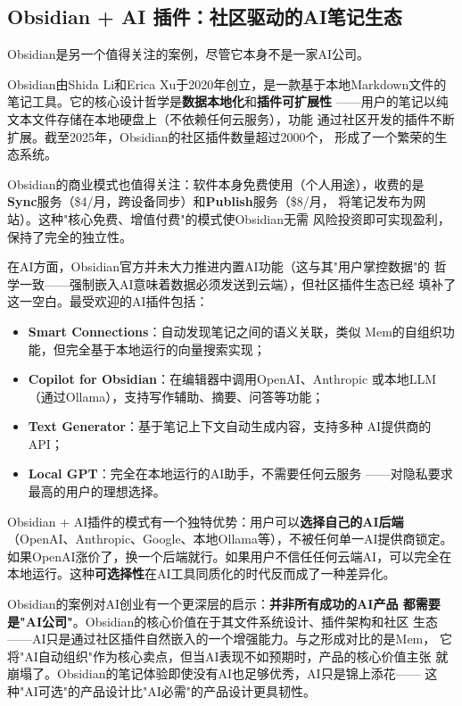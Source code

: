 \subsection{Obsidian + AI 插件：社区驱动的AI笔记生态}
\label{subsec:obsidian-ai}

Obsidian是另一个值得关注的案例，尽管它本身不是一家AI公司。

Obsidian由Shida Li和Erica Xu于2020年创立，是一款基于本地Markdown文件的
笔记工具。它的核心设计哲学是\textbf{数据本地化}和\textbf{插件可扩展性}
——用户的笔记以纯文本文件存储在本地硬盘上（不依赖任何云服务），功能
通过社区开发的插件不断扩展。截至2025年，Obsidian的社区插件数量超过2000个，
形成了一个繁荣的生态系统。

Obsidian的商业模式也值得关注：软件本身免费使用（个人用途），收费的是
\textbf{Sync}服务（\$4/月，跨设备同步）和\textbf{Publish}服务（\$8/月，
将笔记发布为网站）。这种"核心免费、增值付费"的模式使Obsidian无需
风险投资即可实现盈利，保持了完全的独立性。

在AI方面，Obsidian官方并未大力推进内置AI功能（这与其"用户掌控数据"的
哲学一致——强制嵌入AI意味着数据必须发送到云端），但社区插件生态已经
填补了这一空白。最受欢迎的AI插件包括：

\begin{itemize}
  \item \textbf{Smart Connections}：自动发现笔记之间的语义关联，类似
    Mem的自组织功能，但完全基于本地运行的向量搜索实现；
  \item \textbf{Copilot for Obsidian}：在编辑器中调用OpenAI、Anthropic
    或本地LLM（通过Ollama），支持写作辅助、摘要、问答等功能；
  \item \textbf{Text Generator}：基于笔记上下文自动生成内容，支持多种
    AI提供商的API；
  \item \textbf{Local GPT}：完全在本地运行的AI助手，不需要任何云服务
    ——对隐私要求最高的用户的理想选择。
\end{itemize}

Obsidian + AI插件的模式有一个独特优势：用户可以\textbf{选择自己的AI后端}
（OpenAI、Anthropic、Google、本地Ollama等），不被任何单一AI提供商锁定。
如果OpenAI涨价了，换一个后端就行。如果用户不信任任何云端AI，可以完全在
本地运行。这种\textbf{可选择性}在AI工具同质化的时代反而成了一种差异化。

Obsidian的案例对AI创业有一个更深层的启示：\textbf{并非所有成功的AI产品
都需要是"AI公司"}。Obsidian的核心价值在于其文件系统设计、插件架构和社区
生态——AI只是通过社区插件自然嵌入的一个增强能力。与之形成对比的是Mem，
它将"AI自动组织"作为核心卖点，但当AI表现不如预期时，产品的核心价值主张
就崩塌了。Obsidian的笔记体验即使没有AI也足够优秀，AI只是锦上添花——
这种"AI可选"的产品设计比"AI必需"的产品设计更具韧性。

